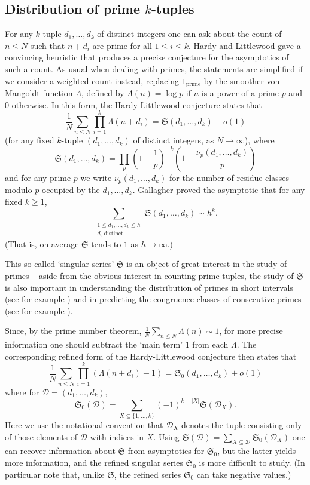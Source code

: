 \documentclass[11pt,letterpaper]{amsart}
\newcommand{\abs}[1]{\left\lvert #1\right\rvert}
\newcommand{\brac}[1]{\left( #1\right)}
\theoremstyle{definition}
\begin{document}
\subsection{Distribution of prime $k$-tuples}\label{subsec:introduction:distribution-of-prime-tuples}
For any $k$-tuple $d_1,\ldots,d_k$ of distinct integers one can ask about the count of $n\leq N$ such that $n+d_i$ are prime for all $1\leq i\leq k$. Hardy and Littlewood \cite{HL} gave a convincing heuristic that produces a precise conjecture for the asymptotics of such a count. As usual when dealing with primes, the statements are simplified if we consider a weighted count instead, replacing $1_{\mathrm{prime}}$ by the smoother von Mangoldt function $\Lambda$, defined by $\Lambda(n)=\log p$ if $n$ is a power of a prime $p$ and $0$ otherwise. In this form, the Hardy-Littlewood conjecture states that
\[\frac 1N \sum_{n\leq N}\prod_{i=1}^k \Lambda(n+d_i)= \mathfrak{S}(d_1,\ldots,d_k)+o(1)\]
(for any fixed $k$-tuple $(d_1,\ldots,d_k)$ of distinct integers, as $N\to \infty$), where
\[ \mathfrak{S}(d_1,\ldots,d_k) = \prod_{p}\brac{1-\frac{1}{p}}^{-k}\brac{1-\frac{\nu_p(d_1,\ldots,d_k)}{p}}\]
and for any prime $p$ we write $\nu_p(d_1,\ldots,d_k)$ for the number of residue classes modulo $p$ occupied by the $d_1,\ldots,d_k$.  Gallagher \cite{Ga} proved the asymptotic that for any fixed $k\geq 1$,
\[\sum_{\substack{1\leq d_1,\ldots,d_k\leq h\\ d_i\textrm{ distinct}}}\mathfrak{S}(d_1,\ldots,d_k)\sim h^k.\]
(That is, on average $\mathfrak{S}$ tends to $1$ as $h\to \infty$.) 

This so-called `singular series' $\mathfrak{S}$ is an object of great interest in the study of primes -- aside from the obvious interest in counting prime tuples, the study of $\mathfrak{S}$ is also important in understanding the distribution of primes in short intervals (see for example \cite{MS04}) and in predicting the congruence classes of consecutive primes (see for example \cite{LOS16}).

Since, by the prime number theorem, $\frac{1}{N}\sum_{n\leq N}\Lambda(n)\sim 1$, for more precise information one should subtract the `main term' $1$ from each $\Lambda$. The corresponding refined form of the Hardy-Littlewood conjecture then states that
\[\frac 1N \sum_{n\leq N}\prod_{i=1}^k (\Lambda(n+d_i)-1)=\mathfrak{S}_0(d_1,\ldots,d_k) + o(1)\]
where for $\mathcal D = (d_1, \ldots, d_k),$
\begin{equation*}
\mathfrak{S}_0(\mathcal D) = \sum_{X\subseteq \{1,\ldots,k\}}(-1)^{k-\abs{X}}\mathfrak{S}(\mathcal D_X).
\end{equation*}
Here we use the notational convention that $\mathcal D_X$ denotes the tuple consisting only of those elements of $\mathcal D$ with indices in $X$.
Using $\mathfrak{S}(\mathcal D)=\sum_{X\subseteq \mathcal D} \mathfrak{S}_0(\mathcal D_X)$ one can recover information about $\mathfrak{S}$ from asymptotics for $\mathfrak{S}_0$, but the latter yields more information, and the refined singular series $\mathfrak{S}_0$ is more difficult to study. (In particular note that, unlike $\mathfrak{S}$, the refined series $\mathfrak{S}_0$ can take negative values.)
\end{document}
